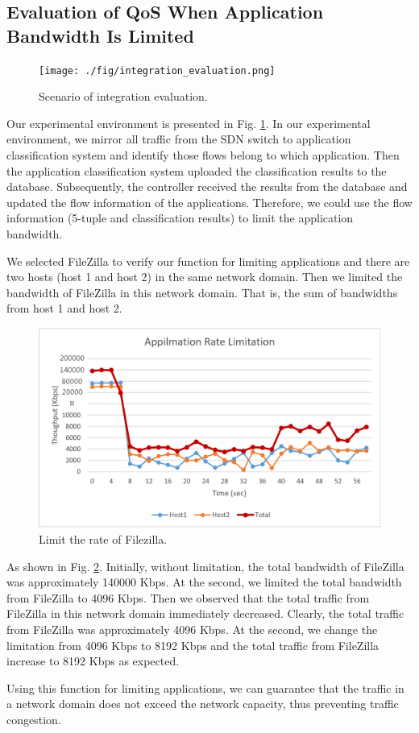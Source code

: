 \subsection{Evaluation of QoS When Application Bandwidth Is Limited}

\begin{figure}[!t]
\centering
\texttt{[image: ./fig/integration\_evaluation.png]}
\caption{Scenario of integration evaluation.}
\label{fig:integration_evaluation}
\end{figure}


Our experimental environment is presented in Fig. \ref{fig:integration_evaluation}.
In our experimental environment, we mirror all traffic from the SDN switch to application classification system and identify those flows belong to which application.
Then the application classification system uploaded the classification results to the database.
Subsequently, the controller received the results from the database and updated the flow information of the applications.
Therefore, we could use the flow information (5-tuple and classification results) to limit the application bandwidth.

We selected FileZilla to verify our function for limiting applications and there are two hosts (host 1 and host 2) in the same network domain.
Then we limited the bandwidth of FileZilla in this network domain.
That is, the sum of bandwidths from host 1 and host 2.

\begin{figure}[!t]
\centering
\includegraphics[width=\textwidth]{./fig/integration_app_filezilla.png}
\caption{Limit the rate of Filezilla.}
\label{fig:integration_app_filezilla}
\end{figure}

As shown in Fig. \ref{fig:integration_app_filezilla}.
Initially, without limitation, the total bandwidth of FileZilla was approximately 140000 Kbps.
At the  second, we limited the total bandwidth from FileZilla to 4096 Kbps.
Then we observed that the total traffic from FileZilla in this network domain immediately decreased.
Clearly, the total traffic from FileZilla was approximately 4096 Kbps.
At the  second, we change the limitation from 4096 Kbps to 8192 Kbps and the total traffic from FileZilla increase to 8192 Kbps as expected.

Using this function for limiting applications, we can guarantee that the traffic in a network domain does not exceed the network capacity, thus preventing traffic congestion.
